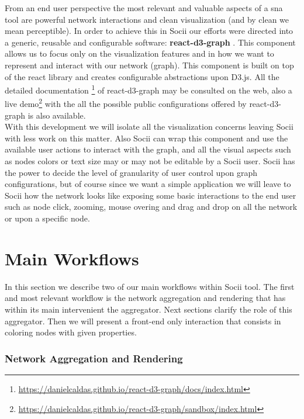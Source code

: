 From an end user perspective the most relevant and valuable aspects of a \gls{sna} tool are powerful network interactions and clean visualization (and by clean we mean perceptible). In order to achieve this in Socii our efforts were directed into a generic, reusable and configurable software: \textbf{react-d3-graph} \citep{reactd3graph}. This component allows us to focus only on the visualization features and in how we want to represent and interact with our network (graph). This component is built on top of the react library and creates configurable abstractions upon D3.js. All the detailed documentation \footnote{\url{https://danielcaldas.github.io/react-d3-graph/docs/index.html}} of react-d3-graph
may be consulted on the web, also a live demo\footnote{\url{https://danielcaldas.github.io/react-d3-graph/sandbox/index.html}} with the all the possible public configurations offered by react-d3-graph is also available.\\
With this development we will isolate all the visualization concerns leaving Socii with less work on this matter. Also Socii can wrap this component and use the available user actions to interact with the graph, and all the visual aspects such as nodes colors or text size may or may not be editable by a Socii user. Socii has the power to decide the level of granularity of user control upon graph configurations, but of course since we want a simple application we will leave to Socii how the network looks like exposing some basic interactions to the end user such as node click, zooming, mouse overing and drag and drop on all the network or upon a specific node.

\section{Main Workflows}

In this section we describe two of our main workflows within Socii tool. The first and most relevant workflow is the network aggregation and rendering that has within its main intervenient the aggregator. Next sections clarify the role of this aggregator. Then we will present a front-end only interaction that consists in coloring nodes with given properties.

\subsubsection{Network Aggregation and Rendering}

